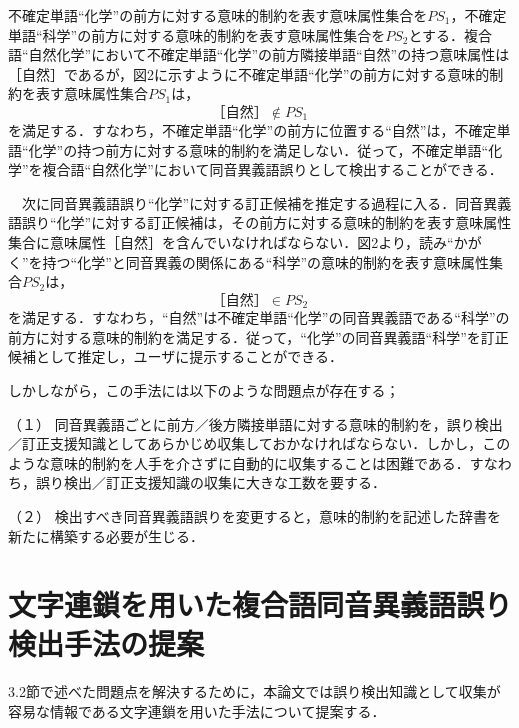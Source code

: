 不確定単語“化学”の前方に対する意味的制約を表す意味属性集合を$PS_1$，不確定単語“科学”の前方に対する意味的制約を表す意味属性集合を$PS_2$とする．複合語“自然化学”において不確定単語“化学”の前方隣接単語“自然”の持つ意味属性は［自然］であるが，図2に示すように不確定単語“化学”の前方に対する意味的制約を表す意味属性集合$PS_1$は，
\[［自然］ \notin  PS_1 \]
を満足する．すなわち，不確定単語“化学”の前方に位置する“自然”は，不確定単語“化学”の持つ前方に対する意味的制約を満足しない．従って，不確定単語“化学”を複合語“自然化学”において同音異義語誤りとして検出することができる．

　次に同音異義語誤り“化学”に対する訂正候補を推定する過程に入る．同音異義語誤り“化学”に対する訂正候補は，その前方に対する意味的制約を表す意味属性集合に意味属性［自然］を含んでいなければならない．図2より，読み“かがく”を持つ“化学”と同音異義の関係にある“科学”の意味的制約を表す意味属性集合$PS_2$は，
\[［自然］ \in  PS_2 \]
を満足する．すなわち，“自然”は不確定単語“化学”の同音異義語である“科学”の前方に対する意味的制約を満足する．従って，“化学”の同音異義語“科学”を訂正候補として推定し，ユーザに提示することができる．


\begin{figure}[ht]
\begin{center}
\end{center}
\end{figure}


しかしながら，この手法には以下のような問題点が存在する；

\begin{description}
\item{（１）}
同音異義語ごとに前方／後方隣接単語に対する意味的制約を，誤り検出／訂正支援知識としてあらかじめ収集しておかなければならない．しかし，このような意味的制約を人手を介さずに自動的に収集することは困難である．すなわち，誤り検出／訂正支援知識の収集に大きな工数を要する．
\item{（２）}
検出すべき同音異義語誤りを変更すると，意味的制約を記述した辞書を新たに構築する必要が生じる．
\end{description}

\section{文字連鎖を用いた複合語同音異義語誤り検出手法の提案}
3.2節で述べた問題点を解決するために，本論文では誤り検出知識として収集が容易な情報である文字連鎖を用いた手法について提案する．

